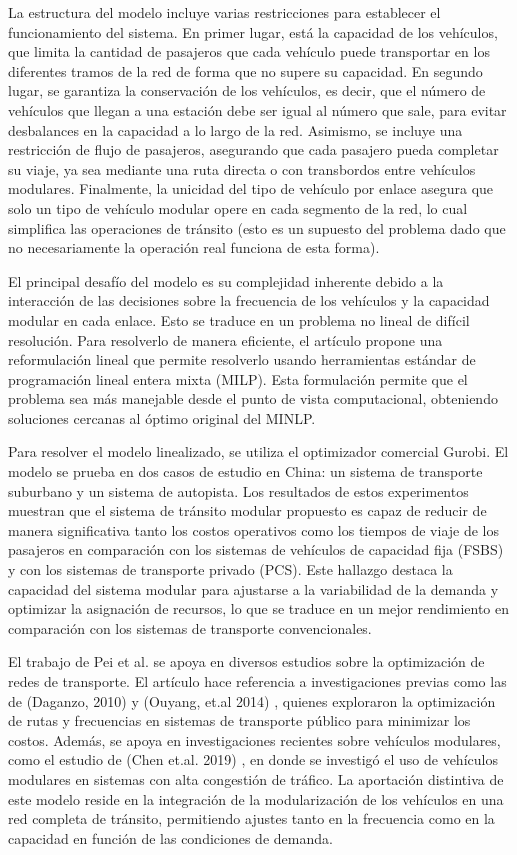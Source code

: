 \documentclass[preprint,11pt]{elsarticle}
\begin{document}
La estructura del modelo incluye varias restricciones para establecer el funcionamiento del sistema. En primer lugar, está la capacidad de los vehículos, que limita la cantidad de pasajeros que cada vehículo puede transportar en los diferentes tramos de la red de forma que no supere su capacidad. En segundo lugar, se garantiza la conservación de los vehículos, es decir, que el número de vehículos que llegan a una estación debe ser igual al número que sale, para evitar desbalances en la capacidad a lo largo de la red. Asimismo, se incluye una restricción de flujo de pasajeros, asegurando que cada pasajero pueda completar su viaje, ya sea mediante una ruta directa o con transbordos entre vehículos modulares. Finalmente, la unicidad del tipo de vehículo por enlace asegura que solo un tipo de vehículo modular opere en cada segmento de la red, lo cual simplifica las operaciones de tránsito (esto es un supuesto del problema dado que no necesariamente la operación real funciona de esta forma).

El principal desafío del modelo es su complejidad inherente debido a la interacción de las decisiones sobre la frecuencia de los vehículos y la capacidad modular en cada enlace. Esto se traduce en un problema no lineal de difícil resolución. Para resolverlo de manera eficiente, el artículo propone una reformulación lineal que permite resolverlo usando herramientas estándar de programación lineal entera mixta (MILP). Esta formulación permite que el problema sea más manejable desde el punto de vista computacional, obteniendo soluciones cercanas al óptimo original del MINLP.

Para resolver el modelo linealizado, se utiliza el optimizador comercial Gurobi. El modelo se prueba en dos casos de estudio en China: un sistema de transporte suburbano y un sistema de autopista. Los resultados de estos experimentos muestran que el sistema de tránsito modular propuesto es capaz de reducir de manera significativa tanto los costos operativos como los tiempos de viaje de los pasajeros en comparación con los sistemas de vehículos de capacidad fija (FSBS) y con los sistemas de transporte privado (PCS). Este hallazgo destaca la capacidad del sistema modular para ajustarse a la variabilidad de la demanda y optimizar la asignación de recursos, lo que se traduce en un mejor rendimiento en comparación con los sistemas de transporte convencionales.

El trabajo de Pei et al. se apoya en diversos estudios sobre la optimización de redes de transporte. El artículo hace referencia a investigaciones previas como las de (Daganzo, 2010) \textcite{daganzo2010} y (Ouyang, et.al 2014) \textcite{ouyang2014}, quienes exploraron la optimización de rutas y frecuencias en sistemas de transporte público para minimizar los costos. Además, se apoya en investigaciones recientes sobre vehículos modulares, como el estudio de (Chen et.al. 2019) \textcite{chen2019}, en donde se investigó el uso de vehículos modulares en sistemas con alta congestión de tráfico. La aportación distintiva de este modelo reside en la integración de la modularización de los vehículos en una red completa de tránsito, permitiendo ajustes tanto en la frecuencia como en la capacidad en función de las condiciones de demanda.
\end{document}

